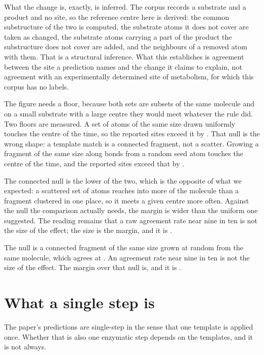 \documentclass[journal=jcisd8,manuscript=suppinfo,layout=onecolumn]{achemso}
\begin{document}
What the change is, exactly, is inferred. The corpus records a substrate and a
product and no site, so the reference centre here is derived: the common substructure of the two
is computed, the substrate atoms it does not cover are taken as changed, the substrate atoms
carrying a part of the product the substructure does not cover are added, and the neighbours of a
removed atom with them. That is a structural inference. What this establishes is agreement between
the site a prediction names and the change it claims to explain, not agreement with an
experimentally determined site of metabolism, for which this corpus has no labels.

The figure needs a floor, because both sets are subsets of the same molecule and on a small
substrate with a large centre they would meet whatever the rule did. Two floors are measured. A
set of atoms of the same size drawn uniformly touches the centre \numSiteNullPct{} of the time, so
the reported sites exceed it by \numSiteMarginPct{}. That null is the wrong shape: a template match
is a connected fragment, not a scatter. Growing a fragment of the same size along bonds from a
random seed atom touches the centre \numSiteConnectednullPct{} of the time, and the reported sites
exceed that by \numSiteConnectedmarginPct{}.

The connected null is the lower of the two, which is the opposite of what we expected: a scattered
set of atoms reaches into more of the molecule than a fragment clustered in one
place, so it meets a given centre more often. Against the null the comparison actually needs, the
margin is wider than the uniform one suggested. The reading remains that a raw agreement rate near
nine in ten is not the size of the effect; the size is the margin, and it is
\numSiteConnectedmargin{}.


The null is a connected fragment of the same
size grown at random from the same molecule, which agrees at \numSiteConnectednullPct{}. An
agreement rate near nine in ten is not the size of the effect. The margin over that null is, and it
is \numSiteConnectedmargin{}.
\section{What a single step is}
\label{sec:si-singlestep}

The paper's predictions are single-step in the sense that one template is applied once. Whether
that is also one enzymatic step depends on the templates, and it is not always.
\end{document}
